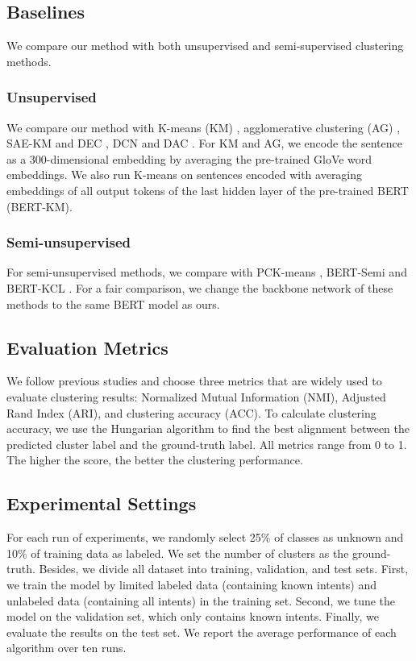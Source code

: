 \documentclass[letterpaper]{article} \usepackage{aaai20}  \usepackage{times}  \usepackage{helvet} \usepackage{courier}  \usepackage[hyphens]{url}  \usepackage{graphicx} \urlstyle{rm} \def\UrlFont{\rm}  \usepackage{graphicx}  \frenchspacing  \setlength{\pdfpagewidth}{8.5in}  \setlength{\pdfpageheight}{11in}
\newcommand{\citep}{\cite}
\begin{document}
\subsection{Baselines}
We compare our method with both unsupervised and semi-supervised clustering methods. 
\subsubsection{Unsupervised} We compare our method with K-means (KM) \cite{macqueen1967some}, agglomerative clustering (AG) \cite{gowda1978agglomerative}, SAE-KM and DEC \cite{xie2016unsupervised} , DCN \cite{yang2017towards} and DAC \cite{chang2017deep}. For KM and AG, we encode the sentence as a 300-dimensional embedding by averaging the pre-trained GloVe \cite{pennington2014glove} word embeddings. We also run K-means on sentences encoded with averaging embeddings of all output tokens of the last hidden layer of the pre-trained BERT (BERT-KM).





\subsubsection{Semi-unsupervised} For semi-unsupervised methods, we compare with PCK-means \cite{basu2004active} , BERT-Semi \cite{wang-etal-2016-semi} and BERT-KCL \cite{hsu2018learning}. For a fair comparison, we change the backbone network of these methods to the same BERT model as ours. 


\subsection{Evaluation Metrics}
We follow previous studies and choose three metrics that are widely used to evaluate clustering results: Normalized Mutual Information (NMI), Adjusted Rand Index (ARI), and clustering accuracy (ACC). To calculate clustering accuracy, we use the Hungarian algorithm \citep{kuhn1955hungarian} to find the best alignment between the predicted cluster label and the ground-truth label. All metrics range from 0 to 1. The higher the score, the better the clustering performance.

\subsection{Experimental Settings}
For each run of experiments, we randomly select 25\% of classes as unknown and 10\% of training data as labeled. We set the number of clusters as the ground-truth. Besides, we divide all dataset into training, validation, and test sets. First, we train the model by limited labeled data (containing known intents) and unlabeled data (containing all intents) in the training set. Second, we tune the model on the validation set, which only contains known intents. Finally, we evaluate the results on the test set. We report the average performance of each algorithm over ten runs.
\end{document}

